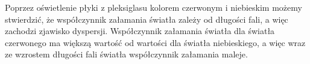 \documentclass{article}
\begin{document}
Poprzez oświetlenie płyki z pleksiglasu kolorem czerwonym i niebieskim możemy stwierdzić, że współczynnik załamania światła zależy od długości fali, a więc zachodzi zjawisko dyspersji. Współczynnik załamania światła dla światła czerwonego ma większą wartość od wartości dla światła niebieskiego, a więc wraz ze wzrostem długości fali światła współczynnik załamania maleje.
\end{document}
